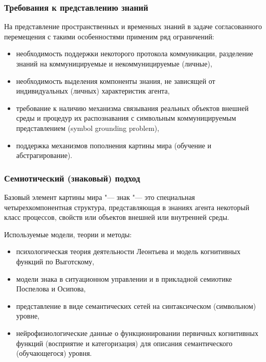 \documentclass[default]{beamer}
\begin{document}
	\begin{frame}
		\frametitle{Требования к представлению знаний}

		На представление пространственных и временных знаний в задаче согласованного перемещения с такими особенностями применим ряд ограничений:
		\begin{itemize}
			\item необходимость поддержки некоторого протокола коммуникации, разделение знаний на коммуницируемые и некоммуницируемые (личные),
			\item необходимость выделения компоненты знания, не зависящей от индивидуальных (личных) характеристик агента,
			\item требование к наличию механизма связывания реальных объектов внешней среды и процедур их распознавания с символьным коммуницируемым представлением (symbol grounding problem),
			\item поддержка механизмов пополнения картины мира (обучение и абстрагирование).
		\end{itemize}
	\end{frame}

	\begin{frame}
		\frametitle{Семиотический (знаковый) подход}
		
		Базовый элемент картины мира "--- знак "--- это специальная четырехкомпонентная структура, представляющая в знаниях агента некоторый класс процессов, свойств или объектов внешней или внутренней среды.
		
		Используемые модели, теории и методы:
		\begin{itemize}
			\item психологическая теория деятельности Леонтьева и модель когнитивных функций по Выготскому,
			\item модели знака в ситуационном управлении и в прикладной семиотике Поспелова и Осипова,
			\item представление в виде семантических сетей на синтаксическом (символьном) уровне,
			\item нейрофизиологические данные о функционировании первичных когнитивных функций (восприятие и категоризация) для описания семантического (обучающегося) уровня.
		\end{itemize}
	\end{frame}
\end{document}
